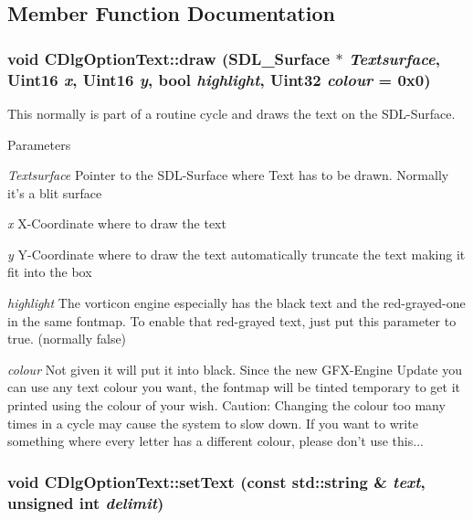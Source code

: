 \subsection{Member Function Documentation}
\hypertarget{class_c_dlg_option_text_a098be3cab83afc259f05590bd894368a}{
\subsubsection[{draw}]{\setlength{\rightskip}{0pt plus 5cm}void CDlgOptionText::draw (SDL\_\-Surface $\ast$ {\em Textsurface}, \/  Uint16 {\em x}, \/  Uint16 {\em y}, \/  bool {\em highlight}, \/  Uint32 {\em colour} = {\ttfamily 0x0})}}
\label{class_c_dlg_option_text_a098be3cab83afc259f05590bd894368a}


This normally is part of a routine cycle and draws the text on the SDL-\/Surface. 


\begin{DoxyParams}{Parameters}
\item[{\em Textsurface}]Pointer to the SDL-\/Surface where Text has to be drawn. Normally it's a blit surface \item[{\em x}]X-\/Coordinate where to draw the text \item[{\em y}]Y-\/Coordinate where to draw the text automatically truncate the text making it fit into the box \item[{\em highlight}]The vorticon engine especially has the black text and the red-\/grayed-\/one in the same fontmap. To enable that red-\/grayed text, just put this parameter to true. (normally false) \item[{\em colour}]Not given it will put it into black. Since the new GFX-\/Engine Update you can use any text colour you want, the fontmap will be tinted temporary to get it printed using the colour of your wish. Caution: Changing the colour too many times in a cycle may cause the system to slow down. If you want to write something where every letter has a different colour, please don't use this... \end{DoxyParams}
\hypertarget{class_c_dlg_option_text_aaa35c07e33b5555aa99b1d24ef9bb629}{
\subsubsection[{setText}]{\setlength{\rightskip}{0pt plus 5cm}void CDlgOptionText::setText (const std::string \& {\em text}, \/  unsigned int {\em delimit})}}
\label{class_c_dlg_option_text_aaa35c07e33b5555aa99b1d24ef9bb629}


